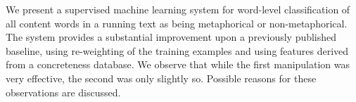 We present a supervised machine learning system for word-level classification of all content words in a running text as being metaphorical or non-metaphorical. The system provides a substantial improvement upon a previously published baseline, using re-weighting of the training examples and using features derived from a concreteness database. We observe that while the first manipulation was very effective, the second was only slightly so. Possible reasons for these observations are discussed.
